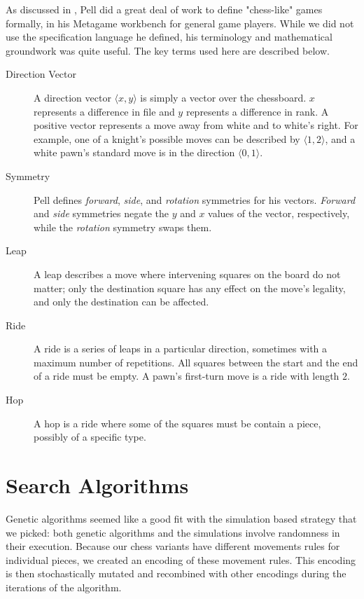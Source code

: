 \documentclass[11pt,letterpaper]{article}
\begin{document}
As discussed in \cite{agd1}, Pell \cite{metagame} did a great deal of work to
define "chess-like" games formally, in his Metagame workbench for general game
players. While we did not use the specification language he defined, his
terminology and mathematical groundwork was quite useful. The key terms used
here are described below.

\begin{description}
   \item [Direction Vector] A direction vector \(\langle x,y \rangle\) is simply
      a vector over the chessboard. \(x\) represents a difference in file and
      \(y\) represents a difference in rank. A positive vector represents a move
      away from white and to white's right. For example, one of a knight's
      possible moves can be described by \(\langle 1,2 \rangle\), and a white
      pawn's standard move is in the direction \(\langle 0,1 \rangle\).
   \item [Symmetry] Pell defines \textit{forward}, \textit{side}, and
      \textit{rotation} symmetries for his vectors. \textit{Forward} and
      \textit{side} symmetries negate the \(y\) and \(x\) values of the vector,
      respectively, while the \textit{rotation} symmetry swaps them.
   \item [Leap] A leap describes a move where intervening squares on the board
      do not matter; only the destination square has any effect on the move's
      legality, and only the destination can be affected.
   \item [Ride] A ride is a series of leaps in a particular direction, sometimes
      with a maximum number of repetitions. All squares between the start and
      the end of a ride must be empty. A pawn's first-turn move is a ride with
      length \(2\).
   \item [Hop] A hop is a ride where some of the squares must be contain a
      piece, possibly of a specific type.
\end{description}

\section{Search Algorithms}
Genetic algorithms seemed like a good fit with the simulation based strategy that we picked: both genetic algorithms and the simulations involve randomness in their execution. Because our chess variants have different movements rules for individual pieces, we created an encoding of these movement rules. This encoding is then stochastically mutated and recombined with other encodings during the iterations of the algorithm.
\end{document}
